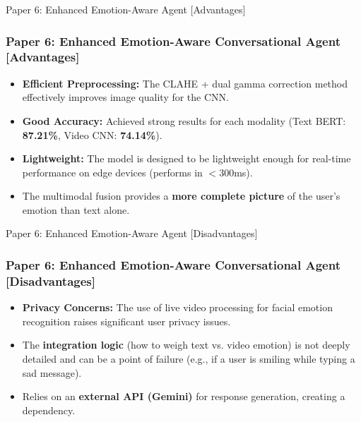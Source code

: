 \documentclass[11pt]{beamer}
\begin{document}
\begin{frame}{Paper 6: Enhanced Emotion-Aware Agent [Advantages]}
\frametitle{Paper 6: Enhanced Emotion-Aware Conversational Agent [Advantages]}
\begin{itemize}
    \item \textbf{Efficient Preprocessing:} The CLAHE + dual gamma correction method effectively improves image quality for the CNN.
    \item \textbf{Good Accuracy:} Achieved strong results for each modality (Text BERT: \textbf{87.21\%}, Video CNN: \textbf{74.14\%}).
    \item \textbf{Lightweight:} The model is designed to be lightweight enough for real-time performance on edge devices (performs in $<$300ms).
    \item The multimodal fusion provides a \textbf{more complete picture} of the user's emotion than text alone.
\end{itemize}
\end{frame}

\begin{frame}{Paper 6: Enhanced Emotion-Aware Agent [Disadvantages]}
\frametitle{Paper 6: Enhanced Emotion-Aware Conversational Agent [Disadvantages]}
\begin{itemize}
    \item \textbf{Privacy Concerns:} The use of live video processing for facial emotion recognition raises significant user privacy issues.
    \item The \textbf{integration logic} (how to weigh text vs. video emotion) is not deeply detailed and can be a point of failure (e.g., if a user is smiling while typing a sad message).
    \item Relies on an \textbf{external API (Gemini)} for response generation, creating a dependency.
\end{itemize}
\end{frame}
\end{document}
